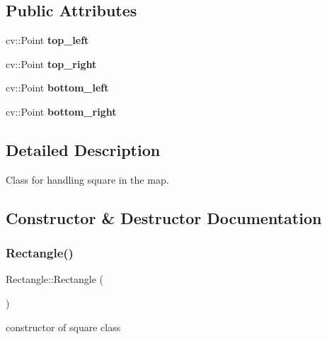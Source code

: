 \subsection*{Public Attributes}
\begin{DoxyCompactItemize}
\item 
\mbox{\label{class_rectangle_a705f4807bb92477bef644fcd63ed6c20}} 
cv\+::\+Point {\bfseries top\+\_\+left}
\item 
\mbox{\label{class_rectangle_aa6c87573306e8ee0a7470350bfe2a17f}} 
cv\+::\+Point {\bfseries top\+\_\+right}
\item 
\mbox{\label{class_rectangle_a5d2107189bd36969453560dce722ce6d}} 
cv\+::\+Point {\bfseries bottom\+\_\+left}
\item 
\mbox{\label{class_rectangle_a6ed1f4dfabeb0930b864e08fb5be5915}} 
cv\+::\+Point {\bfseries bottom\+\_\+right}
\end{DoxyCompactItemize}


\subsection{Detailed Description}
Class for handling square in the map. 

\subsection{Constructor \& Destructor Documentation}
\mbox{\label{class_rectangle_a8a933e0ebd9e80ce91e61ffe87fd577e}} 
\subsubsection{\texorpdfstring{Rectangle()}{Rectangle()}}
{\footnotesize\ttfamily Rectangle\+::\+Rectangle (\begin{DoxyParamCaption}{ }\end{DoxyParamCaption})}

constructor of square class \mbox{\label{class_rectangle_a494c076b13aadf26efdce07d23c61ddd}} 
